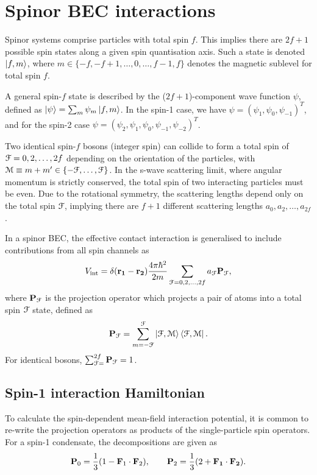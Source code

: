 \section{Spinor BEC interactions}
Spinor systems comprise particles with total spin \(f\).
This implies there are \(2f + 1\) possible spin states along a given spin
quantisation axis.
Such a state is denoted \(\ket{f, m} \), where
\(m \in \{-f, -f+1, \ldots, 0, \ldots, f - 1, f\} \) denotes the magnetic
sublevel for total spin \( f\).

A general spin-\(f\) state is described by the (\(2f+1\))-component wave
function \(\psi \), defined as \(\ket{\psi} = \sum_m\psi_m\ket{f, m}\).
In the spin-1 case, we have \(\psi = {(\psi_1, \psi_0, \psi_{-1})}^T\), and for
the spin-2 case \(\psi = {(\psi_2, \psi_1, \psi_0, \psi_{-1}, \psi_{-2})}^T\).

Two identical spin-\(f\) bosons (integer spin) can collide to form a total spin
of \(\EuScript{F} = 0, 2, \ldots, 2f\) depending on the orientation of the
particles, with \(\EuScript{M} \equiv m+m' \in
\{-\EuScript{F}, \ldots, \EuScript{F}\}\).
In the s-wave scattering limit, where angular momentum is strictly conserved,
the total spin of two interacting particles must be even.
Due to the rotational symmetry, the scattering lengths depend only on the total
spin \(\EuScript{F}\), implying there are \(f + 1\) different scattering lengths
\(a_0, a_2, \ldots, a_{2f}\).

In a spinor BEC, the effective contact interaction is generalised to include
contributions from all spin channels as
\begin{equation}
    V_\mathrm{int} = \delta(\vb{r_1} - \vb{r_2})\frac{4\pi\hbar^2}{2m}
    \sum_{\EuScript{F}=0, 2, \ldots, 2f}a_\EuScript{F}\vb{P}_\EuScript{F},
\end{equation}
where \(\vb{P}_\EuScript{F}\) is the projection operator which projects a pair
of atoms into a total spin \(\EuScript{F}\) state, defined as
\begin{equation}
    \vb{P}_\EuScript{F} = \sum_{m=-\EuScript{F}}^{\EuScript{F}}
    \ket{\EuScript{F}, \EuScript{M}}\bra{\EuScript{F}, \EuScript{M}}.
\end{equation}
For identical bosons, \(\sum_\EuScript{F=0}^{2f}\vb{P}_\EuScript{F} = 1\).

\subsection{Spin-1 interaction Hamiltonian}
To calculate the spin-dependent mean-field interaction potential, it is common
to re-write the projection operators as products of the single-particle spin
operators.
For a spin-1 condensate, the decompositions are given
as~\cite{Kawaguchi2012, StamperKurn2013}
\begin{equation}
    \vb{P}_0 = \frac{1}{3}(1 - \vb{F}_1 \cdot \vb{F}_2), \qquad
    \vb{P}_2 = \frac{1}{3}(2 + \vb{F_1 \cdot \vb{F}_2}).
\end{equation}

